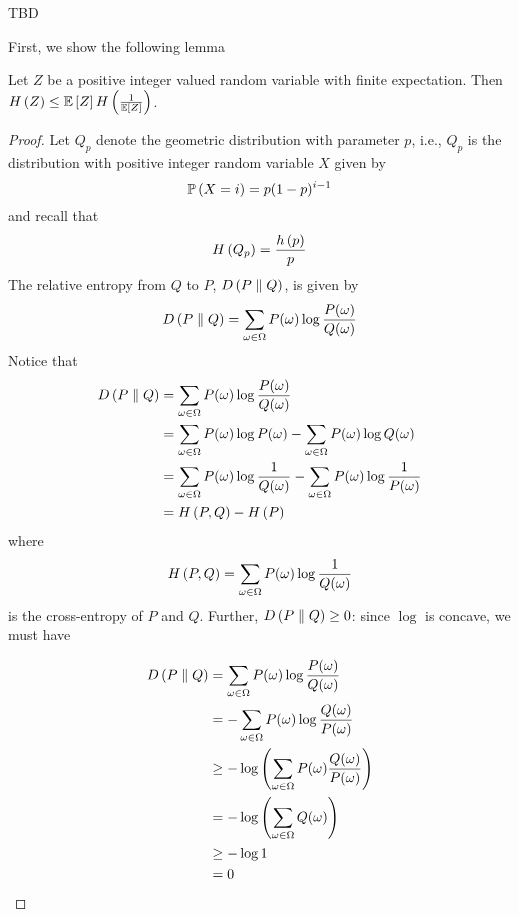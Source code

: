 \begin{example}
    TBD
\end{example}

First, we show the following lemma
\begin{lemma}
    Let $Z$ be a positive integer valued random variable with finite expectation.
    Then $\entropy{Z} \leq \expectation{Z}\entropy{\frac{1}{\expectation{Z}}}$.
\end{lemma}

\begin{proof}
    Let $Q_p$ denote the geometric distribution with parameter $p$, i.e., $Q_p$
    is the distribution with positive integer random variable $X$ given by
    \[\prob{X = i} = p(1 - p)^{i-1}\]
    and recall that
    \[H\left(Q_p\right) = \frac{h\left(p\right)}{p}\]
    The relative entropy from $Q$ to $P$, $D\left(P \parallel Q\right)$, is given by
    \[D\left(P \parallel Q\right) = \sum_{\omega\in\Omega}P(\omega)\log{\frac{P(\omega)}{Q(\omega)}}\]
    Notice that
    \begin{align*}D\left(P \parallel Q\right)
         & = \sum_{\omega\in\Omega}P(\omega)\log{\frac{P(\omega)}{Q(\omega)}}                                                \\
         & = \sum_{\omega\in\Omega}P(\omega)\log{P(\omega)} - \sum_{\omega\in\Omega}P(\omega)\log{Q(\omega)}                 \\
         & = \sum_{\omega\in\Omega}P(\omega)\log\frac{1}{Q(\omega)} - \sum_{\omega\in\Omega}P(\omega)\log\frac{1}{P(\omega)} \\
         & = H\left(P, Q\right) - H\left(P\right)
    \end{align*}
    where
    \[H\left(P, Q\right) = \sum_{\omega\in\Omega}P(\omega)\log\frac{1}{Q(\omega)}\]
    is the cross-entropy of $P$ and $Q$. Further, $D\left(P \parallel Q\right) \geq 0$: since
    $\log$ is concave, we must have

    \begin{align*}D\left(P \parallel Q\right)
         & = \sum_{\omega\in\Omega}P(\omega)\log{\frac{P(\omega)}{Q(\omega)}}                \\
         & = -\sum_{\omega\in\Omega}P(\omega)\log{\frac{Q(\omega)}{P(\omega)}}               \\
         & \geq -\log\left(\sum_{\omega\in\Omega}P(\omega)\frac{Q(\omega)}{P(\omega)}\right) \\
         & = -\log\left(\sum_{\omega\in\Omega}Q(\omega)\right)                               \\
         & \geq -\log{1}                                                                     \\
         & = 0
    \end{align*}


\end{proof}
